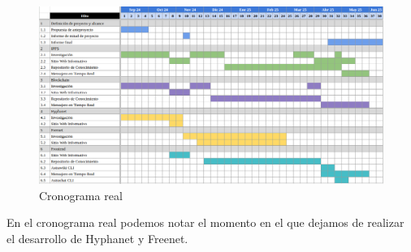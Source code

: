 \begin{figure}[H]
    \centering
    \includegraphics[width=1\linewidth]{img/cronograma-real.png}
    \caption{Cronograma real}
    \label{fig:cronograma-real}
\end{figure}

En el cronograma real podemos notar el momento en el que dejamos de realizar el desarrollo de Hyphanet y Freenet.


    
    
